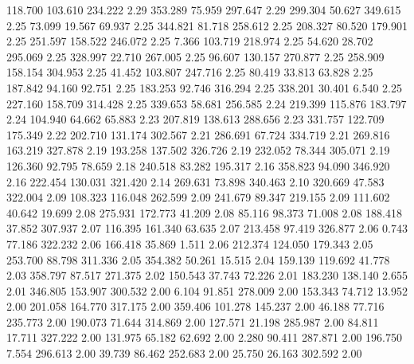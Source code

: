  118.700  103.610  234.222         2.29
 353.289   75.959  297.647         2.29
 299.304   50.627  349.615         2.25
  73.099   19.567   69.937         2.25
 344.821   81.718  258.612         2.25
 208.327   80.520  179.901         2.25
 251.597  158.522  246.072         2.25
   7.366  103.719  218.974         2.25
  54.620   28.702  295.069         2.25
 328.997   22.710  267.005         2.25
  96.607  130.157  270.877         2.25
 258.909  158.154  304.953         2.25
  41.452  103.807  247.716         2.25
  80.419   33.813   63.828         2.25
 187.842   94.160   92.751         2.25
 183.253   92.746  316.294         2.25
 338.201   30.401    6.540         2.25
 227.160  158.709  314.428         2.25
 339.653   58.681  256.585         2.24
 219.399  115.876  183.797         2.24
 104.940   64.662   65.883         2.23
 207.819  138.613  288.656         2.23
 331.757  122.709  175.349         2.22
 202.710  131.174  302.567         2.21
 286.691   67.724  334.719         2.21
 269.816  163.219  327.878         2.19
 193.258  137.502  326.726         2.19
 232.052   78.344  305.071         2.19
 126.360   92.795   78.659         2.18
 240.518   83.282  195.317         2.16
 358.823   94.090  346.920         2.16
 222.454  130.031  321.420         2.14
 269.631   73.898  340.463         2.10
 320.669   47.583  322.004         2.09
 108.323  116.048  262.599         2.09
 241.679   89.347  219.155         2.09
 111.602   40.642   19.699         2.08
 275.931  172.773   41.209         2.08
  85.116   98.373   71.008         2.08
 188.418   37.852  307.937         2.07
 116.395  161.340   63.635         2.07
 213.458   97.419  326.877         2.06
   0.743   77.186  322.232         2.06
 166.418   35.869    1.511         2.06
 212.374  124.050  179.343         2.05
 253.700   88.798  311.336         2.05
 354.382   50.261   15.515         2.04
 159.139  119.692   41.778         2.03
 358.797   87.517  271.375         2.02
 150.543   37.743   72.226         2.01
 183.230  138.140    2.655         2.01
 346.805  153.907  300.532         2.00
   6.104   91.851  278.009         2.00
 153.343   74.712   13.952         2.00
 201.058  164.770  317.175         2.00
 359.406  101.278  145.237         2.00
  46.188   77.716  235.773         2.00
 190.073   71.644  314.869         2.00
 127.571   21.198  285.987         2.00
  84.811   17.711  327.222         2.00
 131.975   65.182   62.692         2.00
   2.280   90.411  287.871         2.00
 196.750    7.554  296.613         2.00
  39.739   86.462  252.683         2.00
  25.750   26.163  302.592         2.00
